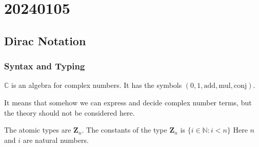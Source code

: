 \chapter{20240105}


\section{Dirac Notation}


\subsection{Syntax and Typing}

\begin{postulate}
  $\mathbb{C}$ is an algebra for complex numbers. It has the symbols $(0, 1, \textrm{add}, \textrm{mul}, \textrm{conj})$.
\end{postulate}
It means that somehow we can express and decide complex number terms, but the theory should not be considered here.

\begin{definition}
  The atomic types are $\mathbf{Z}_n$.
  The constants of the type $\mathbf{Z}_n$ is $\{i \in \mathbb{N} : i<n\}$
  Here $n$ and $i$ are natural numbers.
\end{definition}


\newcommand*{\unit}{\texttt{unit}}
\newcommand*{\utt}{\texttt{tt}}
\newcommand*{\fst}{\texttt{fst}}
\newcommand*{\snd}{\texttt{snd}}
\newcommand*{\reduce}{\ \triangleright\ }

